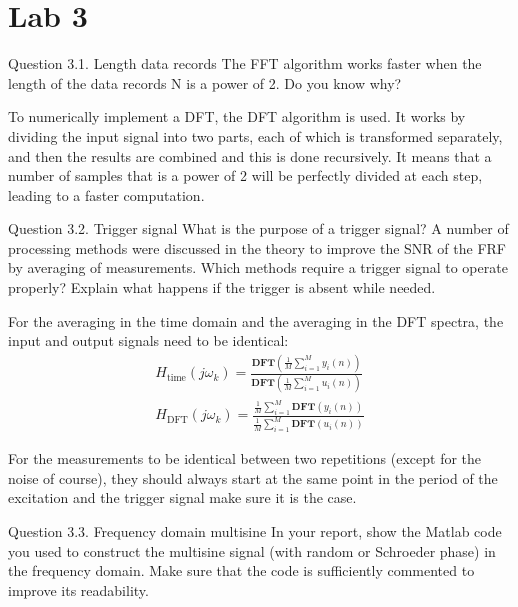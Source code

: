 \setcounter{secnumdepth}{1}

\chapter{Lab 3}


\begin{Task}{Question 3.1. Length data records}
    The FFT algorithm works faster when the length of the data records N is a power of 2. Do you know why?
\end{Task}

To numerically implement a DFT, the DFT algorithm is used. It works by dividing the input signal into two parts, each of which is transformed separately, and then the results are combined and this is done recursively. It means that a number of samples that is a power of 2 will be perfectly divided at each step, leading to a faster computation.

\begin{Task}{Question 3.2. Trigger signal}
    What is the purpose of a trigger signal? A number of processing methods were discussed in the theory to improve the SNR of the FRF by averaging of measurements. Which methods require a trigger signal to operate properly? Explain what happens if the trigger is absent while needed.
\end{Task}

For the averaging in the time domain and the averaging in the DFT spectra, the input and output signals need to be identical:
\begin{align*}
    H_{\text{time}}(j\omega_k) = \frac{\textbf{DFT}\left(\frac{1}{M}\sum_{i=1}^{M}y_i(n)\right)}{\textbf{DFT}\left(\frac{1}{M}\sum_{i=1}^{M}u_i(n)\right)}\\
    H_{\text{DFT}}(j\omega_k) = \frac{\frac{1}{M}\sum_{i=1}^{M}\textbf{DFT}\left(y_i(n)\right)}{\frac{1}{M}\sum_{i=1}^{M}\textbf{DFT}\left(u_i(n)\right)}
\end{align*}

For the measurements to be identical between two repetitions (except for the noise of course), they should always start at the same point in the period of the excitation and the trigger signal make sure it is the case.

\begin{Task}{Question 3.3. Frequency domain multisine}
    In your report, show the Matlab code you used to construct the multisine signal (with random or Schroeder phase) in the frequency domain. Make sure that the code is sufficiently commented to improve its readability.
\end{Task}


